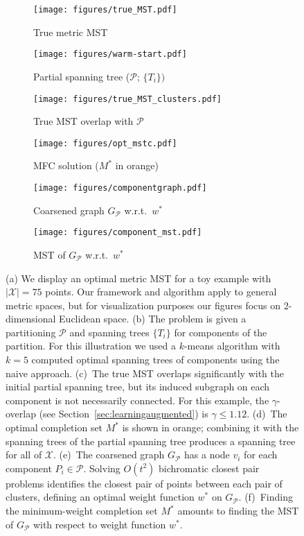 \begin{figure}[t]
	\centering
	\begin{subfigure}[b]{0.32\textwidth}
		\centering
		\texttt{[image: figures/true\_MST.pdf]}
		\caption{True metric MST}
		\label{fig:truemst}
	\end{subfigure}
	\begin{subfigure}[b]{0.32\textwidth}
		\centering
		\texttt{[image: figures/warm-start.pdf]}
		\caption{Partial spanning tree ($\mathcal{P}$; $\{T_i\})$}
		\label{fig:warmstart}
	\end{subfigure}
	\begin{subfigure}[b]{0.32\textwidth}
		\centering
		\texttt{[image: figures/true\_MST\_clusters.pdf]}
		\caption{True MST overlap with $\mathcal{P}$}
		\label{fig:overlap}
	\end{subfigure}
	\begin{subfigure}[b]{0.32\textwidth}
		\centering
		\texttt{[image: figures/opt\_mstc.pdf]}
		\caption{MFC solution ($M^*$ in orange)}
		\label{fig:opt_mfc}
	\end{subfigure}
	\begin{subfigure}[b]{0.32\textwidth}
		\centering
		\texttt{[image: figures/componentgraph.pdf]}
		\caption{Coarsened graph $G_\mathcal{P}$ w.r.t.\ $w^*$}
		\label{fig:coarsenedgraph}
	\end{subfigure}
	\begin{subfigure}[b]{0.32\textwidth}
		\centering
		\texttt{[image: figures/component\_mst.pdf]}
		\caption{MST of $G_\mathcal{P}$ w.r.t.\ $w^*$}
		\label{fig:mstcoarsened}
	\end{subfigure}
	\caption{(a) We display an optimal metric MST for a toy example with $|\mathcal{X}| = 75$ points. Our framework and algorithm apply to general metric spaces, but for visualization purposes our figures focus on 2-dimensional Euclidean space. (b) The \mfc{} problem is given a partitioning $\mathcal{P}$ and spanning trees $\{T_i\}$ for components of the partition. For this illustration we used a $k$-means algorithm with $k = 5$ computed optimal spanning trees of components using the naive approach. (c)~The true MST overlaps significantly with the initial partial spanning tree, but its induced subgraph on each component is not necessarily connected. For this example, the $\gamma$-overlap (see Section~\ref{sec:learningaugmented}) is $\gamma \leq 1.12$. (d)~The optimal completion set $M^*$ is shown in orange; combining it with the spanning trees of the partial spanning tree produces a spanning tree for all of $\mathcal{X}$. (e)~The coarsened graph $G_\mathcal{P}$ has a node $v_i$ for each component $P_i \in \mathcal{P}$. Solving $O(t^2)$ bichromatic closest pair problems identifies the closest pair of points between each pair of clusters, defining an optimal weight function $w^*$ on $G_\mathcal{P}$. (f)~Finding the minimum-weight completion set $M^*$ amounts to finding the MST of $G_\mathcal{P}$ with respect to weight function $w^*$. }
	\label{fig:three_figures}
\end{figure}


